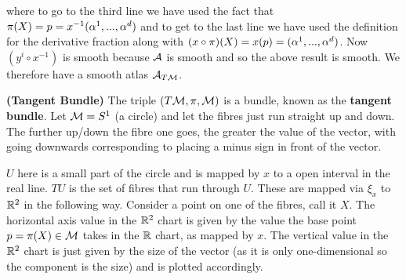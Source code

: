 \documentclass[12pt]{article} %
\newcommand{\bfs}[1]{\textbf{({#1}) }}
\begin{document}
where to go to the third line we have used the fact that $\pi(X) = p = x^{-1}(\alpha^1,...,\alpha^d)$ and to get to the last line we have used the definition for the derivative fraction along with $(x\circ\pi)(X) = x(p) = (\alpha^1,...,\alpha^d)$. Now $(y^i\circ x^{-1})$ is smooth because $\mathcal{A}$ is smooth and so the above result is smooth. We therefore have a smooth atlas $\mathcal{A}_{T\mathcal{M}}$.

\bd\bfs{Tangent Bundle}
    The triple $(T\mathcal{M},\pi,\mathcal{M})$ is a bundle, known as the \textbf{tangent bundle}. 
\ed 
\bex 
    Let $\mathcal{M}=S^1$ (a circle) and let the fibres just run straight up and down. The further up/down the fibre one goes, the greater the value of the vector, with going downwards corresponding to placing a minus sign in front of the vector.

    $U$ here is a small part of the circle and is mapped by $x$ to a open interval in the real line. $TU$ is the set of fibres that run through $U$. These are mapped via $\xi_x$ to $\mathbb{R}^2$ in the following way. Consider a point on one of the fibres, call it $X$. The horizontal axis value in the $\mathbb{R}^2$ chart is given by the value the base point $p=\pi(X)\in\mathcal{M}$ takes in the $\mathbb{R}$ chart, as mapped by $x$. The vertical value in the $\mathbb{R}^2$ chart is just given by the size of the vector (as it is only one-dimensional so the component is the size) and is plotted accordingly.
\end{document}

